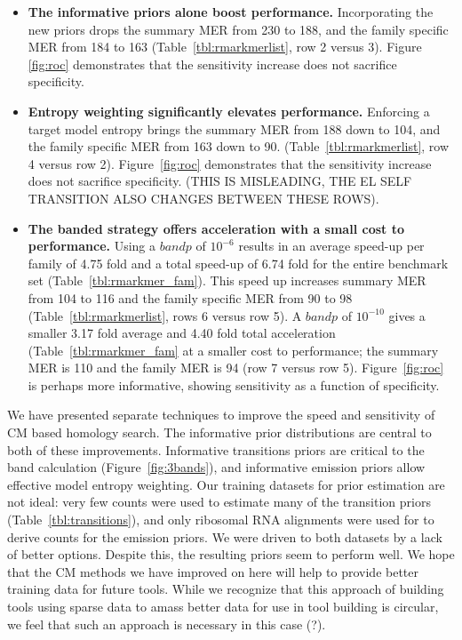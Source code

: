 \documentclass[11pt]{article}
\begin{document}
\begin{itemize}
\item
\textbf{The informative priors alone boost performance.}
Incorporating the new priors drops the summary MER from 230 to 188,
and the family specific MER from 184 to 163
(Table~\ref{tbl:rmarkmerlist}, row 2 versus 3). Figure \ref{fig:roc}
demonstrates that the sensitivity increase does not sacrifice specificity.

\item
\textbf{Entropy weighting significantly elevates performance.}
Enforcing a target model entropy brings the summary MER from 188 down to
104, and the family specific MER from 163 down to 90. 
(Table~\ref{tbl:rmarkmerlist}, row 4 versus row 2). Figure~\ref{fig:roc}
demonstrates that the sensitivity increase does not sacrifice
specificity.
 (THIS IS
MISLEADING, THE EL SELF TRANSITION ALSO CHANGES BETWEEN THESE ROWS).

\item
\textbf{The banded strategy offers acceleration with a small cost to
performance.} Using a $bandp$ of $10^{-6}$ results in an average
speed-up per family of 4.75 fold and a total speed-up of 6.74 fold for the
entire benchmark set (Table~\ref{tbl:rmarkmer_fam}).  This speed up
increases summary MER from 104 to 116 and
the family specific MER from 90 to 98 (Table~\ref{tbl:rmarkmerlist},
rows 6 versus row 5). A $bandp$ of $10^{-10}$ gives a smaller
3.17 fold average and 4.40 fold total acceleration
(Table~\ref{tbl:rmarkmer_fam} at a smaller cost to performance;
the summary MER is 110 and the family MER is 94 (row 7 versus row
5). Figure~\ref{fig:roc} is perhaps more informative, showing sensitivity
as a function of specificity.
\end{itemize}

We have presented separate techniques to improve the speed and 
sensitivity of CM based homology search. 
The informative prior distributions are central to both of these
improvements. Informative transitions priors are critical to
the band calculation (Figure~\ref{fig:3bands}), and informative
emission priors allow effective model entropy weighting. Our training
datasets for prior estimation are not ideal: very few counts were used
to estimate many of the transition priors
(Table~\ref{tbl:transitions}), and only ribosomal RNA alignments were
used for to derive counts for the  emission priors. We were driven to
both datasets by a lack of better options. Despite this, the resulting
priors seem to perform well. We hope that the CM methods we have
improved on here will help to provide better training data for future
tools. While we recognize that this approach of building tools using
sparse data to amass better data for use in tool building is circular,
we feel that such an approach is necessary in this case (?).
\end{document}
